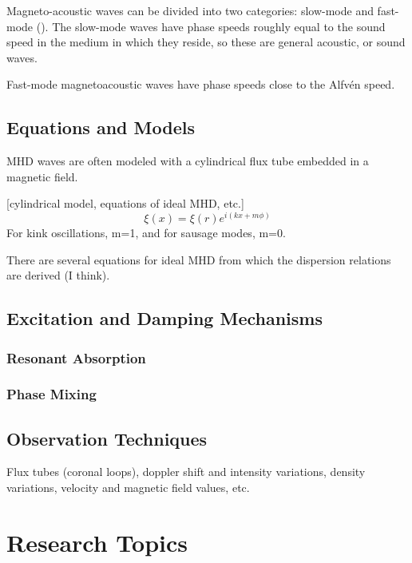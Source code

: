 \documentclass[preprint2]{aastex}
\begin{document}
Magneto-acoustic waves can be divided into two categories:
slow-mode and fast-mode (\cite{Asc}).
The slow-mode waves have phase speeds roughly equal to the sound speed
in the medium in which they reside, so these are general acoustic, or
sound waves.

Fast-mode magnetoacoustic waves have phase speeds close to the Alfv\'en
speed.

\subsection{Equations and Models}
MHD waves are often modeled with a cylindrical flux tube embedded
in a magnetic field.

[cylindrical model, equations of ideal MHD, etc.]
\begin{equation}
 \xi(x) = \xi(r)e^{i(kx+m\phi)}
\end{equation}
For kink oscillations, m=1, and for sausage modes, m=0.

There are several equations for ideal MHD from which the dispersion
relations are derived (I think).
\subsection{Excitation and Damping Mechanisms}
\subsubsection{Resonant Absorption}
\subsubsection{Phase Mixing}
\subsection{Observation Techniques}
Flux tubes (coronal loops), doppler shift and intensity variations,
density variations, velocity and magnetic field values,
etc.
\section{Research Topics}\label{topics}
\end{document}
